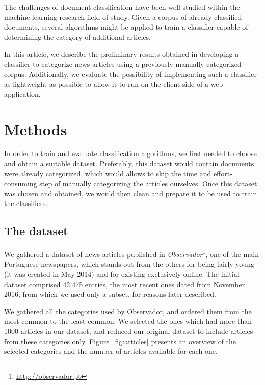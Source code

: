 \documentclass[conference]{IEEEtran}
\begin{document}
The challenges of document classification have been well studied
within the machine learning research field of
study\cite{borko1963automatic,sebastiani2002machine,rubin2012statistical}.
Given a corpus of already classified documents, several algorithms
might be applied to train a classifier capable of determining the
category of additional articles.

In this article, we describe the preliminary results obtained in
developing a classifier to categorize news articles using a previously
manually categorized corpus. Additionally, we evaluate the possibility
of implementing such a classifier as lightweight as possible to allow
it to run on the client side of a web application.

\section{Methods}
In order to train and evaluate classification algorithms, we first
needed to choose and obtain a suitable dataset. Preferably, this
dataset would contain documents were already categorized, which would
allows to skip the time and effort-consuming step of manually
categorizing the articles ourselves. Once this dataset was chosen and
obtained, we would then clean and prepare it to be used to train the
classifiers.

\subsection{The dataset}
We gathered a dataset of news articles published in
\textit{Observador}\footnote{\url{http://observador.pt}}, one of the
main Portuguese newspapers, which stands out from the others for being
fairly young (it was created in May 2014) and for existing exclusively
online. The initial dataset comprised 42.475 entries, the most recent
ones dated from November 2016, from which we used only a subset, for
reasons later described.

We gathered all the categories used by Observador, and ordered them
from the most common to the least common. We selected the ones which
had more than 1000 articles in our dataset, and reduced our original
dataset to include articles from these categories only.
Figure~\ref{fig:articles} presents an overview of the selected
categories and the number of articles available for each one.
\end{document}
